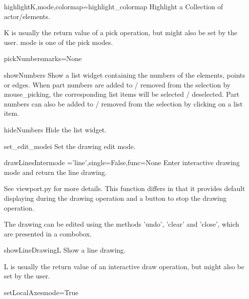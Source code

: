 \begin{funcdesc}{highlight}{K,mode,colormap=highlight_colormap}
Highlight a Collection of actor/elements.

K is usually the return value of a pick operation, but might also
be set by the user.
mode is one of the pick modes.

\end{funcdesc}

\begin{funcdesc}{pickNumbers}{marks=None}
\end{funcdesc}

\begin{funcdesc}{showNumbers}{}
Show a list widget containing the numbers of the elements,
points or edges. When part numbers are added to / removed from
the selection by mouse_picking, the corresponding list items will be
selected / deselected. Part numbers can also be added to / removed
from the selection by clicking on a list item.

\end{funcdesc}

\begin{funcdesc}{hideNumbers}{}
Hide the list widget.
\end{funcdesc}

\begin{funcdesc}{set_edit_mode}{i}
Set the drawing edit mode.
\end{funcdesc}

\begin{funcdesc}{drawLinesInter}{mode ='line',single=False,func=None}
Enter interactive drawing mode and return the line drawing.

See viewport.py for more details.
This function differs in that it provides default displaying
during the drawing operation and a button to stop the drawing operation.

The drawing can be edited using the methods 'undo', 'clear' and 'close', which
are presented in a combobox.

\end{funcdesc}

\begin{funcdesc}{showLineDrawing}{L}
Show a line drawing.

L is usually the return value of an interactive draw operation, but
might also be set by the user.

\end{funcdesc}

\begin{funcdesc}{setLocalAxes}{mode=True}
\end{funcdesc}

